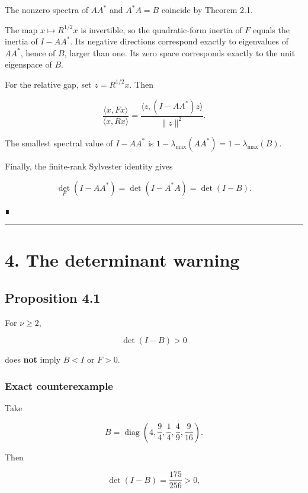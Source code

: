 The nonzero spectra of \(AA^*\) and \(A^*A=B\) coincide by Theorem 2.1.

The map \(x\mapsto R^{1/2}x\) is invertible, so the quadratic-form inertia of
\(F\) equals the inertia of \(I-AA^*\). Its negative directions correspond
exactly to eigenvalues of \(AA^*\), hence of \(B\), larger than one. Its zero
space corresponds exactly to the unit eigenspace of \(B\).

For the relative gap, set \(z=R^{1/2}x\). Then

\[
\frac{\langle x,Fx\rangle}{\langle x,Rx\rangle}
=
\frac{\langle z,(I-AA^*)z\rangle}{\|z\|^2}.
\]

The smallest spectral value of \(I-AA^*\) is
\(1-\lambda_{\max}(AA^*)=1-\lambda_{\max}(B)\).

Finally, the finite-rank Sylvester identity gives

\[
\det_{\!F}(I-AA^*)
=
\det(I-A^*A)
=
\det(I-B).
\]

∎

\begin{center}\rule{0.5\linewidth}{0.5pt}\end{center}

\hypertarget{the-determinant-warning}{%
\section{4. The determinant warning}\label{the-determinant-warning}}

\hypertarget{proposition-4.1}{%
\subsection{Proposition 4.1}\label{proposition-4.1}}

For \(\nu\ge2\),

\[
\det(I-B)>0
\]

does \textbf{not} imply \(B<I\) or \(F>0\).

\hypertarget{exact-counterexample}{%
\subsubsection{Exact counterexample}\label{exact-counterexample}}

Take

\[
B=\operatorname{diag}
\left(
4,\frac94,\frac14,\frac49,\frac9{16}
\right).
\]

Then

\[
\det(I-B)=\frac{175}{256}>0,
\]

